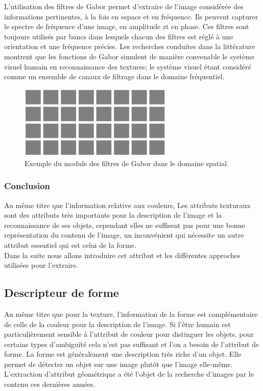 L'utilisation des filtres de Gabor permet d'extraire de l'image considérée des informations pertinentes, à la fois en espace et en fréquence. Ils peuvent capturer le spectre de fréquence d'une image, en amplitude zt en phase. Ces filtres sont toujours utilisés par bancs dans lesquels chacun des filtres est réglé à une orientation et une fréquence précise. Les recherches conduites dans la littérature montrent que les fonctions de Gabor simulent de manière convenable le système visuel humain en reconnaissance des textures; le système visuel étant considéré comme un ensemble de canaux de filtrage dans le domaine fréquentiel.
 \begin{figure}[H]
 	\label{fig:gabor49}
 	\centering
 	\includegraphics[width=0.65\textwidth]{Figures/gabor49} %
 	
 	\caption{Exemple du module des filtres de Gabor dans le domaine spatial.}
 	
 \end{figure}
 
 
\subsubsection{Conclusion}

Au même titre que l'information relative aux couleurs, Les attributs texturaux sont des attributs très importants pour la description de l'image et la reconnaissance de ses objets, cependant elles ne suffisent pas pour une bonne représentation du contenu de l'image, un inconvénient qui nécessite un autre attribut essentiel qui est celui de la forme.\\

Dans la suite nous allons introduire cet attribut et les différentes approches utilisées pour
l'extraire.

\subsection{Descripteur de forme}
Au même titre que pour la texture, l'information de la forme est complémentaire de celle de la couleur pour la description de l'image.  Si l'être humain est particulièrement sensible à l'attribut de couleur pour distinguer les objets, pour certains types d'ambiguïté cela n'est pas suffisant et l'on a besoin de l'attribut de forme. La forme est généralement une description très riche d’un objet. Elle permet de détecter un objet sur une image plutôt que l’image elle-même. L’extraction d’attribut géométrique a été l’objet de la recherche d’images par le contenu ces dernières années.\\

